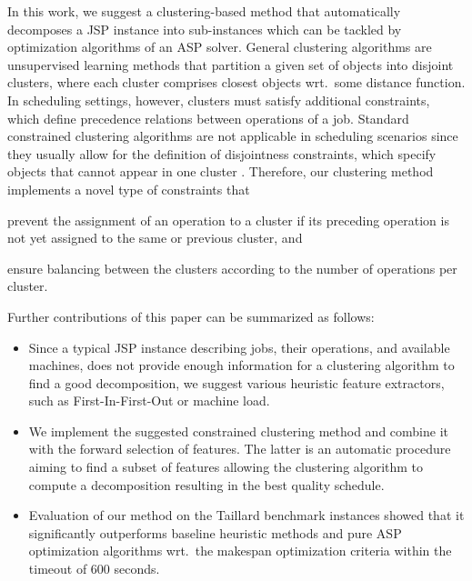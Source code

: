 \documentclass[runningheads]{llncs}
\begin{document}
In this work, we suggest a clustering-based method that automatically decomposes a JSP instance into sub-instances which can be tackled by 
optimization algorithms of an ASP solver. 
General clustering algorithms are unsupervised learning methods that partition a given set of objects into disjoint clusters, where each cluster comprises closest objects wrt.\ some distance function. 
In scheduling settings, however, clusters must satisfy additional constraints, which define precedence relations between operations of a job. Standard constrained clustering algorithms are not applicable in scheduling scenarios since they usually allow for the definition of disjointness constraints, which specify objects that cannot appear in one cluster \cite{zhang2019framework,wagstaff2001constrained,ding2020unified}. 
Therefore, our clustering method implements a novel type of constraints that
\begin{enumerate*}[label=\emph{(\roman*)}]
  \item prevent the assignment of an operation to a cluster if its preceding operation is not yet assigned to the same or previous cluster, and
  \item ensure balancing between the clusters according to the number of operations per cluster.
\end{enumerate*}
Further contributions of this paper can be summarized as follows:
\begin{itemize}
  \item Since a typical JSP instance describing jobs, their operations, and available machines, does not provide enough information for a clustering algorithm to find a good decomposition, we suggest various heuristic feature extractors, such as First-In-First-Out or machine load.
  \item We implement the suggested constrained clustering method and combine it with the forward selection of features. The latter is an automatic procedure aiming to find a subset of features allowing the clustering algorithm to compute a decomposition resulting in the best quality schedule.
  \item Evaluation of our method on the Taillard benchmark instances \cite{taillard1993benchmarks} showed that it significantly outperforms baseline heuristic methods and pure ASP optimization algorithms wrt.\ the makespan optimization criteria within the timeout of 600 seconds.
\end{itemize}
\end{document}
